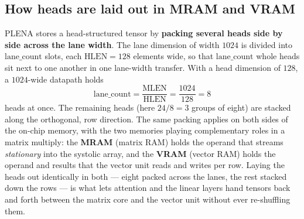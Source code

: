 \documentclass[11pt]{report}
\begin{document}
\subsection{How heads are laid out in MRAM and VRAM}

PLENA stores a head-structured tensor by \textbf{packing several heads
side by side across the lane width}. The lane dimension of width $1024$ is
divided into $\text{lane\_count}$ slots, each $\text{HLEN}=128$ elements
wide, so that $\text{lane\_count}$ whole heads sit next to one another in
one lane-width transfer. With a head dimension of $128$, a $1024$-wide
datapath holds
\[
\text{lane\_count} = \frac{\text{MLEN}}{\text{HLEN}} = \frac{1024}{128} = 8
\]
heads at once. The remaining heads (here $24/8 = 3$ groups of eight) are
stacked along the orthogonal, row direction. The same packing applies on
both sides of the on-chip memory, with the two memories playing
complementary roles in a matrix multiply: the \textbf{MRAM} (matrix RAM)
holds the operand that streams \emph{stationary} into the systolic array,
and the \textbf{VRAM} (vector RAM) holds the operand and results that the
vector unit reads and writes per row. Laying the heads out identically in
both --- eight packed across the lanes, the rest stacked down the rows ---
is what lets attention and the linear layers hand tensors back and forth
between the matrix core and the vector unit without ever re-shuffling them.
\end{document}
